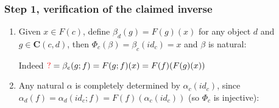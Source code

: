 \documentclass[handout]{beamer}
\newcommand{\redc}{{\color{red} c}}
\newcommand{\bfsf}[1]{{\boldsymbol{#1}}}
\newcommand{\CC}{\bfsf{C}}
\begin{document}
\frame
  {   
    \frametitle{Step 1, verification of the claimed inverse}\label{Yon:bijection}

 \begin{enumerate}[<+->]
\item Given $x\in F(c)$, define $\beta_d(g)=F(g)(x)$ for any object $d$ 
and $g\in\CC(c,d)$, then $\Phi_c(\beta)=\beta_c(id_c) =x$ and $\beta$ is natural:
Indeed ${\color{red} ?}=\beta_e(g;f)=F(g;f)(x) = F(f)(F(g)(x))$
\item Any natural $\alpha$ is completely determined by $\alpha_c(id_c)$, 
since $\alpha_d(f)=\alpha_d(id_c;f)=F(f)(\alpha_c(id_c))$
(so $\Phi_c$ is injective):\\
 \end{enumerate}

 }
\end{document}
